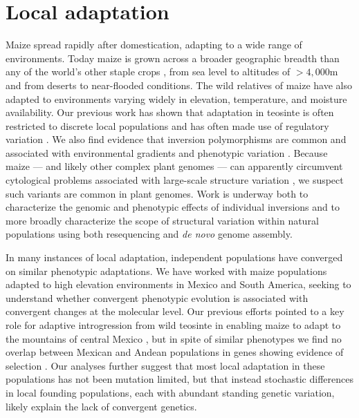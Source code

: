 \documentclass[11pt,letterpaper]{article}
\begin{document}
\section*{Local adaptation} %

Maize spread rapidly after domestication, adapting to a wide range of environments. 
Today maize is grown across a broader geographic breadth than any of the world's other staple crops \citep{hake2015genetic}, from sea level to altitudes of $>4,000$m and from deserts to near-flooded conditions.
The wild relatives of maize have also adapted to environments varying widely in elevation, temperature, and moisture availability. 
Our previous work has shown that adaptation in teosinte is often restricted to discrete local populations and has often made use of regulatory variation \citep{pyhajarvi2013complex}.
We also find evidence that inversion polymorphisms are common and associated with environmental gradients and phenotypic variation \cite{pyhajarvi2013complex,fang2012megabase}.
Because maize --- and likely other complex plant genomes --- can apparently circumvent cytological problems associated with large-scale structure variation \citep{maguire1966relationship}, we suspect such variants are common in plant genomes.
Work is underway both to characterize the genomic and phenotypic effects of individual inversions and to more broadly characterize the scope of structural variation within natural populations using both resequencing and \emph{de novo} genome assembly.

In many instances of local adaptation, independent populations have converged on similar phenotypic adaptations.  
We have worked with maize populations adapted to high elevation environments in Mexico and South America, seeking to understand whether convergent phenotypic evolution is associated with convergent changes at the molecular level.
Our previous efforts pointed to a key role for adaptive introgression from wild teosinte in enabling maize to adapt to the mountains of central Mexico \citep{hufford2013genomic}, but in spite of similar phenotypes we find no overlap between Mexican and Andean populations in genes showing evidence of selection \citep{Takuno15062015}.
Our analyses further suggest that most local adaptation in these populations has not been mutation limited, but that instead stochastic differences in local founding populations, each with abundant standing genetic variation, likely explain the lack of convergent genetics.
\end{document}
